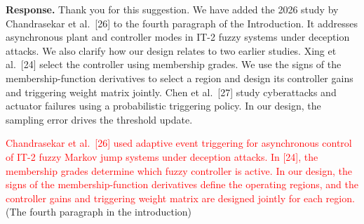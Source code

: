 \documentclass[12pt,a4paper]{article}
\begin{document}
\textbf{Response.}
\begingroup
\setlength{\parskip}{6pt}
Thank you for this suggestion. We have added the 2026 study by Chandrasekar et al.~[26] to the fourth paragraph of the Introduction. It addresses asynchronous plant and controller modes in IT-2 fuzzy systems under deception attacks. We also clarify how our design relates to two earlier studies. Xing et al.~[24] select the controller using membership grades. We use the signs of the membership-function derivatives to select a region and design its controller gains and triggering weight matrix jointly. Chen et al.~[27] study cyberattacks and actuator failures using a probabilistic triggering policy. In our design, the sampling error drives the threshold update.\par
\noindent \textcolor{red}{Chandrasekar et al.~[26] used adaptive event triggering for asynchronous control of IT-2 fuzzy Markov jump systems under deception attacks. In [24], the membership grades determine which fuzzy controller is active. In our design, the signs of the membership-function derivatives define the operating regions, and the controller gains and triggering weight matrix are designed jointly for each region.} (The fourth paragraph in the introduction)\par
\endgroup

%
%
\end{document}
